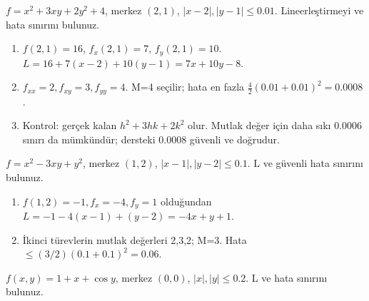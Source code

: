 \begin{tcolorbox}[title={Örnek 5.8 | Defterdeki hata sınırı},colframe=accent]\(f=x^2+3xy+2y^2+4\), merkez \((2,1)\), \(|x-2|,|y-1|\le0.01\). Lineerleştirmeyi ve hata sınırını bulunuz.
\par{}\end{tcolorbox}
\begin{tcolorbox}[title={Adım adım çözüm},colback=green!3!white,colframe=green]\begin{enumerate}
\item \(f(2,1)=16\), \(f_x(2,1)=7\), \(f_y(2,1)=10\). \(L=16+7(x-2)+10(y-1)=7x+10y-8\).
\item \(f_{xx}=2,f_{xy}=3,f_{yy}=4\). M=4 seçilir; hata en fazla \(\tfrac42(0.01+0.01)^2=0.0008\).
\item Kontrol: gerçek kalan \(h^2+3hk+2k^2\) olur. Mutlak değer için daha sıkı \(0.0006\) sınırı da mümkündür; dersteki \(0.0008\) güvenli ve doğrudur.
\end{enumerate}\end{tcolorbox}
\begin{tcolorbox}[title={Örnek 5.9 | İkinci hata sınırı sorusu},colframe=accent]\(f=x^2-3xy+y^2\), merkez \((1,2)\), \(|x-1|,|y-2|\le0.1\). L ve güvenli hata sınırını bulunuz.
\par{}\end{tcolorbox}
\begin{tcolorbox}[title={Adım adım çözüm},colback=green!3!white,colframe=green]\begin{enumerate}
\item \(f(1,2)=-1,f_x=-4,f_y=1\) olduğundan \(L=-1-4(x-1)+(y-2)=-4x+y+1\).
\item İkinci türevlerin mutlak değerleri 2,3,2; M=3. Hata \(\le(3/2)(0.1+0.1)^2=0.06\).
\end{enumerate}\end{tcolorbox}
\begin{tcolorbox}[title={Örnek 5.10 | Küçük bölgede kosinüs hatası},colframe=accent]\(f(x,y)=1+x+\cos y\), merkez \((0,0)\), \(|x|,|y|\le0.2\). L ve hata sınırını bulunuz.
\par{}\end{tcolorbox}
